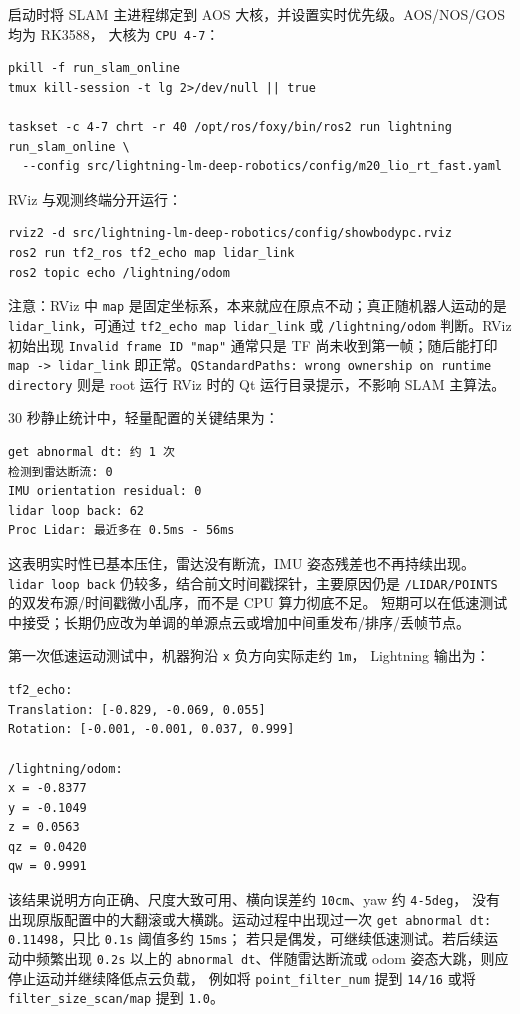 \documentclass[UTF8,11pt,a4paper]{ctexart}
\begin{document}
启动时将 SLAM 主进程绑定到 AOS 大核，并设置实时优先级。AOS/NOS/GOS 均为 RK3588，
大核为 \texttt{CPU 4-7}：

\begin{verbatim}
pkill -f run_slam_online
tmux kill-session -t lg 2>/dev/null || true

taskset -c 4-7 chrt -r 40 /opt/ros/foxy/bin/ros2 run lightning run_slam_online \
  --config src/lightning-lm-deep-robotics/config/m20_lio_rt_fast.yaml
\end{verbatim}

RViz 与观测终端分开运行：

\begin{verbatim}
rviz2 -d src/lightning-lm-deep-robotics/config/showbodypc.rviz
ros2 run tf2_ros tf2_echo map lidar_link
ros2 topic echo /lightning/odom
\end{verbatim}

注意：RViz 中 \texttt{map} 是固定坐标系，本来就应在原点不动；真正随机器人运动的是
\texttt{lidar\_link}，可通过 \texttt{tf2\_echo map lidar\_link} 或
\texttt{/lightning/odom} 判断。RViz 初始出现
\texttt{Invalid frame ID "map"} 通常只是 TF 尚未收到第一帧；随后能打印
\texttt{map -> lidar\_link} 即正常。\texttt{QStandardPaths: wrong ownership on runtime directory}
则是 root 运行 RViz 时的 Qt 运行目录提示，不影响 SLAM 主算法。

30 秒静止统计中，轻量配置的关键结果为：

\begin{verbatim}
get abnormal dt: 约 1 次
检测到雷达断流: 0
IMU orientation residual: 0
lidar loop back: 62
Proc Lidar: 最近多在 0.5ms - 56ms
\end{verbatim}

这表明实时性已基本压住，雷达没有断流，IMU 姿态残差也不再持续出现。
\texttt{lidar loop back} 仍较多，结合前文时间戳探针，主要原因仍是
\texttt{/LIDAR/POINTS} 的双发布源/时间戳微小乱序，而不是 CPU 算力彻底不足。
短期可以在低速测试中接受；长期仍应改为单调的单源点云或增加中间重发布/排序/丢帧节点。

第一次低速运动测试中，机器狗沿 \texttt{x} 负方向实际走约 \texttt{1m}，
Lightning 输出为：

\begin{verbatim}
tf2_echo:
Translation: [-0.829, -0.069, 0.055]
Rotation: [-0.001, -0.001, 0.037, 0.999]

/lightning/odom:
x = -0.8377
y = -0.1049
z = 0.0563
qz = 0.0420
qw = 0.9991
\end{verbatim}

该结果说明方向正确、尺度大致可用、横向误差约 \texttt{10cm}、yaw 约 \texttt{4-5deg}，
没有出现原版配置中的大翻滚或大横跳。运动过程中出现过一次
\texttt{get abnormal dt: 0.11498}，只比 \texttt{0.1s} 阈值多约 \texttt{15ms}；
若只是偶发，可继续低速测试。若后续运动中频繁出现 \texttt{0.2s} 以上的
\texttt{abnormal dt}、伴随雷达断流或 odom 姿态大跳，则应停止运动并继续降低点云负载，
例如将 \texttt{point\_filter\_num} 提到 \texttt{14/16} 或将
\texttt{filter\_size\_scan/map} 提到 \texttt{1.0}。
\end{document}
